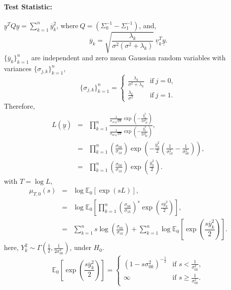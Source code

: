 \documentclass[a4paper,english,12pt]{article}
\newcommand{\te}{\textrm}
\begin{document}
\paragraph{Test Statistic:} 
$\underline{y}^TQ\underline{y}=\sum_{k=1}^{n}\overline{y}_k^2$,
 $\te{where}\ Q=(\Sigma_0^{-1}-\Sigma_1^{-1})$, and,
\begin{equation}
\overline{y}_k=\sqrt{ \frac{\lambda_k}{\sigma^2(\sigma^2+\lambda_k)}} \:\underline{v}_k^T\underline{y}.
\end{equation}
$\{\overline{y}_k\}_{k=1}^n$ are independent and zero mean Gaussian random variables with variances $\{\sigma_{j,k}\}_{k=1}^n$,
\begin{equation}\{\sigma_{j,k}\}_{k=1}^n=\begin{cases}
\frac{\lambda_k}{\sigma^2+\lambda_k} & \text{if}\ j=0 ,\\
\frac{\lambda_k}{\sigma^2}& \text{if}\ j=1.
\end{cases}
\end{equation}
Therefore,
\begin{eqnarray}
L(\underline{y})&=&\prod_{k=1}^{n}\frac{\frac{1}{\sigma_{1k}\sqrt{2\pi}}\exp\left(-\frac{\overline{y}_k^2}{2\sigma_{1k}^2} \right) }{\frac{1}{\sigma_{0k}\sqrt{2\pi}}\exp\left(-\frac{\overline{y}_k^2}{2\sigma_{0k}^2} \right)},\nonumber\\
&=&\prod_{k=1}^{n}\left(\frac{\sigma_{0k}}{\sigma_{1k}} \right) \exp\left(-\frac{\overline{y}_k^2}{2}\left(\frac{1}{\sigma_{1k}^2}-\frac{1}{\sigma_{0k}^2} \right)  \right),\nonumber\\
&=&\prod_{k=1}^{n}\left(\frac{\sigma_{0k}}{\sigma_{1k}} \right) \exp\left(\frac{\overline{y}_k^2}{2}\right).
\end{eqnarray}
with $T=\log{L}$,
\begin{eqnarray}
\mu_{T,0}(s)&=&\log{\mathbb{E}_0\left[\exp(sL)\right]},\nonumber\\
&=&\log{\mathbb{E}_0\left[\prod_{k=1}^{n}\left(\frac{\sigma_{0k}}{\sigma_{1k}} \right)^{s} \exp\left(\frac{s\overline{y}_k^2}{2}\right)\right]},\nonumber\\
&=&\sum_{k=1}^{n}s\log\left(\frac{\sigma_{0k}}{\sigma_{1k}} \right) + \sum_{k=1}^{n}\log{\mathbb{E}_0\left[\exp\left( \dfrac{s\overline{y}_k^2}{2}\right) \right]}.
\end{eqnarray}
here, $ Y_k^2 \sim \Gamma\left(\frac{1}{2},\frac{1}{2\sigma_{0k}^2} \right) $, under $ H_0 $.
\begin{equation}
\mathbb{E}_0\left[\exp\left( \dfrac{s\overline{y}_k^2}{2}\right) \right]=\begin{cases}
\left( 1-s\sigma_{0k}^2\right)^{-\frac{1}{2}} & \text{if $s<\frac{1}{\sigma_{0k}^2}$} ,\\
\infty& \text{if $s\geq\frac{1}{\sigma_{0k}^2}$}.
\end{cases}
\end{equation}
\end{document}
